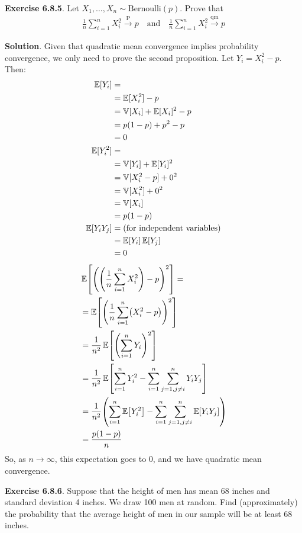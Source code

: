 \textbf{Exercise 6.8.5}. Let
\(X_{1}, \dots, X_{n} \sim \text{Bernoulli}(p)\). Prove that
\begin{align*}\frac{1}{n} \sum_{i=1}^{n} X_{i}^{2} \xrightarrow{\textrm{P}} p
\quad\mathrm{and}\quad 
\frac{1}{n} \sum_{i=1}^{n} X_{i}^{2} \xrightarrow{\text{qm}} p
\end{align*}

\textbf{Solution}.
Given that quadratic mean convergence implies probability convergence,
we only need to prove the second proposition.
Let \(Y_{i} = X_{i}^{2} - p\). Then:
\begin{align*}
\operatorname{\mathbb{E}}[Y_{i}] & = \\
& = \operatorname{\mathbb{E}}[X_{i}^{2}] - p \\
& = \operatorname{\mathbb{V}}[X_{i}] + \operatorname{\mathbb{E}}[X_{i}]^{2} - p \\
& = p(1-p) + p^{2} - p \\
& = 0 \\
\operatorname{\mathbb{E}}[Y_{i}^{2}] & = \\
& = \operatorname{\mathbb{V}}[Y_{i}] + \operatorname{\mathbb{E}}[Y_{i}]^{2} \\
& = \operatorname{\mathbb{V}}[X_{i}^{2} - p] + 0^{2} \\
& = \operatorname{\mathbb{V}}[X_{i}^{2}] + 0^{2} \\
& = \operatorname{\mathbb{V}}[X_{i}]\\
& = p(1-p) \\
\operatorname{\mathbb{E}}[Y_{i} Y_{j}] & = \text{(for independent variables)}\\
& = \operatorname{\mathbb{E}}[Y_{i}] \operatorname{\mathbb{E}}[Y_{j}] \\
& = 0
\end{align*}
\begin{align*}
& \EXP\left[\left(\left(\frac{1}{n} \sum_{i=1}^{n} X_{i}^{2}\right) - p\right)^{2}\right] = \\
& = \EXP\left[\left(\frac{1}{n} \sum_{i=1}^{n} \left(X_{i}^{2} - p\right)\right)^{2}\right] \\
& = \frac{1}{n^{2}} \EXP\left[\left(\sum_{i=1}^{n} Y_{i}\right)^{2}\right] \\
& = \frac{1}{n^{2}} \EXP\left[\sum_{i=1}^{n} Y_{i}^{2} - \sum_{i=1}^{n} \sum_{j=1, j \neq i}^{n} Y_{i} Y_{j}\right] \\
& = \frac{1}{n^{2}} \left( \sum_{i=1}^{n} \EXP\left[Y_{i}^{2}\right] - \sum_{i=1}^{n} \sum_{j=1, j \neq i}^{n} \EXP\left[ Y_{i} Y_{j} \right] \right) \\
& = \frac{p(1-p)}{n}
\end{align*}
So, as \(n \rightarrow \infty\), this expectation goes to 0, and we have
quadratic mean convergence.

\textbf{Exercise 6.8.6}. Suppose that the height of men has mean 68
inches and standard deviation 4 inches. We draw 100 men at random. Find
(approximately) the probability that the average height of men in our
sample will be at least 68 inches.

